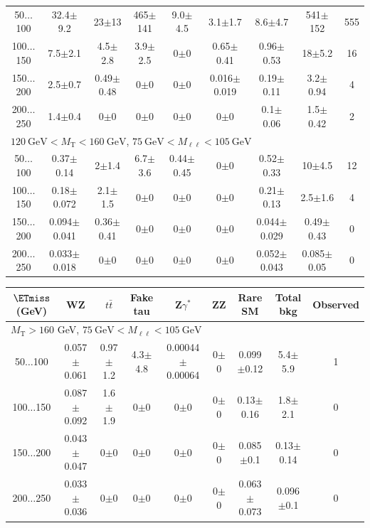 \begin{landscape}
\begin{table}
\begin{center}
\begin{tabular}{| c | c c c c c c  | c  c | }
50$\dots$100&32.4$\pm$9.2&23$\pm$13&465$\pm$141&9.0$\pm$4.5&3.1$\pm$1.7&8.6$\pm$4.7&541$\pm$152&555\\
100$\dots$150&7.5$\pm$2.1&4.5$\pm$2.8&3.9$\pm$2.5&0$\pm$0&0.65$\pm$0.41&0.96$\pm$0.53&18$\pm$5.2&16\\
150$\dots$200&2.5$\pm$0.7&0.49$\pm$0.48&0$\pm$0&0$\pm$0&0.016$\pm$0.019&0.19$\pm$0.11&3.2$\pm$0.94&4\\
200$\dots$250&1.4$\pm$0.4&0$\pm$0&0$\pm$0&0$\pm$0&0$\pm$0&0.1$\pm$0.06&1.5$\pm$0.42&2\\
\hline\hline
\multicolumn{7}{l}{$120~\mathrm{GeV} < M_{\text{T}} < 160~\mathrm{GeV}$, $75~\mathrm{GeV} < M_{\ell\ell} < 105~\mathrm{GeV}$}\\\hline\hline
50$\dots$100&0.37$\pm$0.14&2$\pm$1.4&6.7$\pm$3.6&0.44$\pm$0.45&0$\pm$0&0.52$\pm$0.33&10$\pm$4.5&12\\
100$\dots$150&0.18$\pm$0.072&2.1$\pm$1.5&0$\pm$0&0$\pm$0&0$\pm$0&0.21$\pm$0.13&2.5$\pm$1.6&4\\
150$\dots$200&0.094$\pm$0.041&0.36$\pm$0.41&0$\pm$0&0$\pm$0&0$\pm$0&0.044$\pm$0.029&0.49$\pm$0.43&0\\
200$\dots$250&0.033$\pm$0.018&0$\pm$0&0$\pm$0&0$\pm$0&0$\pm$0&0.052$\pm$0.043&0.085$\pm$0.05&0\\
\hline\hline
\end{tabular}
\end{center}
\end{table}
\begin{table}
\begin{center}
\begin{tabular}{| c | c c c c c c  | c  c | }\hline\hline
$\ETmiss$ (GeV) & WZ & $t\bar{t}$ & Fake tau & Z$\gamma^*$ & ZZ & Rare SM & Total bkg & Observed\\\hline\hline
\multicolumn{7}{l}{$M_{\text{T}} > 160$ GeV, $75~\mathrm{GeV} < M_{\ell\ell} < 105~\mathrm{GeV}$}\\\hline\hline
50$\dots$100&0.057$\pm$0.061&0.97$\pm$1.2&4.3$\pm$4.8&0.00044$\pm$0.00064&0$\pm$0&0.099$\pm$0.12&5.4$\pm$5.9&1\\
100$\dots$150&0.087$\pm$0.092&1.6$\pm$1.9&0$\pm$0&0$\pm$0&0$\pm$0&0.13$\pm$0.16&1.8$\pm$2.1&0\\
150$\dots$200&0.043$\pm$0.047&0$\pm$0&0$\pm$0&0$\pm$0&0$\pm$0&0.085$\pm$0.1&0.13$\pm$0.14&0\\
200$\dots$250&0.033$\pm$0.036&0$\pm$0&0$\pm$0&0$\pm$0&0$\pm$0&0.063$\pm$0.073&0.096$\pm$0.1&0\\

\end{tabular}
\end{center}
\end{table}
\end{landscape}
